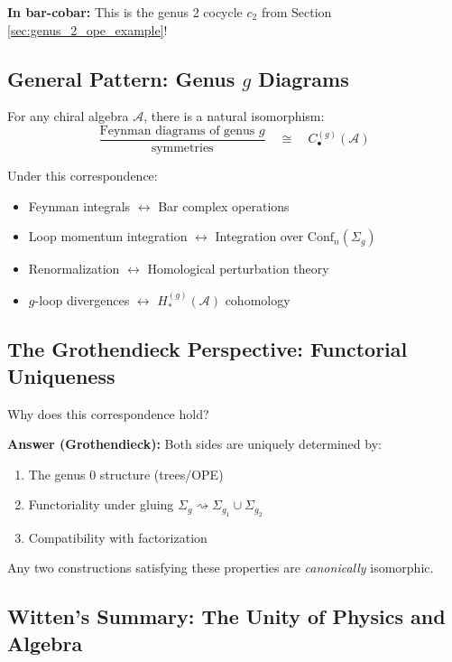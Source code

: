 \textbf{In bar-cobar:} This is the genus 2 cocycle $c_2$ from Section \ref{sec:genus_2_ope_example}!

\subsection{General Pattern: Genus $g$ Diagrams}

\begin{theorem}
For any chiral algebra $\mathcal{A}$, there is a natural isomorphism:
$$\boxed{
\frac{\text{Feynman diagrams of genus }g}{\text{symmetries}}
\quad \cong \quad
C_{\bullet}^{(g)}(\mathcal{A})
}$$

Under this correspondence:
\begin{itemize}
\item Feynman integrals $\leftrightarrow$ Bar complex operations
\item Loop momentum integration $\leftrightarrow$ Integration over $\mathrm{Conf}_n(\Sigma_g)$
\item Renormalization $\leftrightarrow$ Homological perturbation theory
\item $g$-loop divergences $\leftrightarrow$ $H_*^{(g)}(\mathcal{A})$ cohomology
\end{itemize}
\end{theorem}

\subsection{The Grothendieck Perspective: Functorial Uniqueness}

Why does this correspondence hold?

\textbf{Answer (Grothendieck):} Both sides are uniquely determined by:
\begin{enumerate}
\item The genus 0 structure (trees/OPE)
\item Functoriality under gluing $\Sigma_g \rightsquigarrow \Sigma_{g_1} \cup \Sigma_{g_2}$
\item Compatibility with factorization
\end{enumerate}

Any two constructions satisfying these properties are \emph{canonically} isomorphic.

\subsection{Witten's Summary: The Unity of Physics and Algebra}

